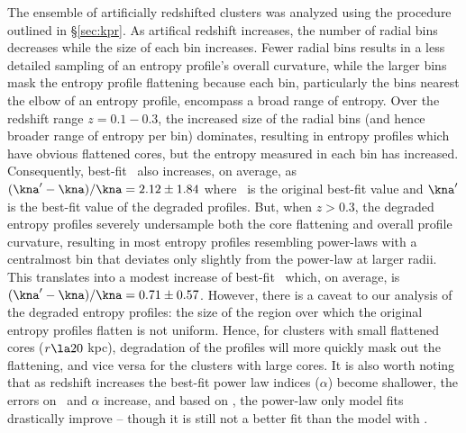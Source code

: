 \documentclass{emulateapj}
\begin{document}
The ensemble of artificially redshifted clusters was analyzed using
the procedure outlined in \S\ref{sec:kpr}. As artifical redshift
increases, the number of radial bins decreases while the size of each
bin increases. Fewer radial bins results in a less detailed sampling
of an entropy profile's overall curvature, while the larger bins mask
the entropy profile flattening because each bin, particularly the bins
nearest the elbow of an entropy profile, encompass a broad range of
entropy. Over the redshift range $z = 0.1-0.3$, the increased size of
the radial bins (and hence broader range of entropy per bin)
dominates, resulting in entropy profiles which have obvious flattened
cores, but the entropy measured in each bin has
increased. Consequently, best-fit \kna\ also increases, on average, as
$\dkna = 2.12 \pm 1.84$ where \kna\ is the original best-fit value and
$\kna^{\prime}$ is the best-fit value of the degraded profiles. But,
when $z > 0.3$, the degraded entropy profiles severely undersample
both the core flattening and overall profile curvature, resulting in
most entropy profiles resembling power-laws with a centralmost bin
that deviates only slightly from the power-law at larger radii. This
translates into a modest increase of best-fit \kna\ which, on average,
is $\dkna = 0.71 \pm 0.57$. However, there is a caveat to our analysis
of the degraded entropy profiles: the size of the region over which
the original entropy profiles flatten is not uniform. Hence, for
clusters with small flattened cores ($r \la 20$ kpc), degradation of
the profiles will more quickly mask out the flattening, and vice versa
for the clusters with large cores. It is also worth noting that as
redshift increases the best-fit power law indices ($\alpha$) become
shallower, the errors on \kna\ and $\alpha$ increase, and based on
\chisq, the power-law only model fits drastically improve -- though it
is still not a better fit than the model with \kna.
\end{document}
